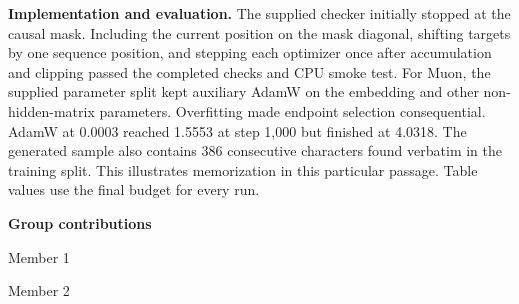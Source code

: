 \documentclass[10pt,a4paper]{article}
\begin{document}
\textbf{Implementation and evaluation.} The supplied checker initially stopped at the causal mask. Including the current position on the mask diagonal, shifting targets by one sequence position, and stepping each optimizer once after accumulation and clipping passed the completed checks and CPU smoke test. For Muon, the supplied parameter split kept auxiliary AdamW on the embedding and other non-hidden-matrix parameters. Overfitting made endpoint selection consequential. AdamW at 0.0003 reached 1.5553 at step 1,000 but finished at 4.0318. The generated sample also contains 386 consecutive characters found verbatim in the training split. This illustrates memorization in this particular passage. Table values use the final budget for every run.\par
\textbf{Group contributions}\par
Member 1 \enspace\hrulefill\par
Member 2 \enspace\hrulefill
\end{document}
